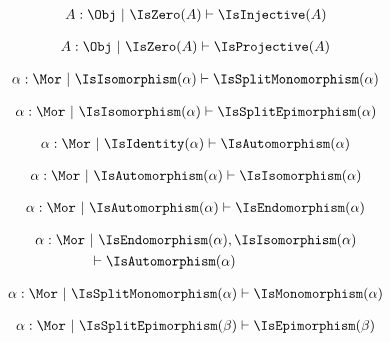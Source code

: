 \begin{sequent}
\begin{align*}
  A:\Obj ~|~ \IsZero( A ) \vdash \IsInjective( A )
\end{align*}
\end{sequent}

\begin{sequent}
\begin{align*}
  A:\Obj ~|~ \IsZero( A ) \vdash \IsProjective( A )
\end{align*}
\end{sequent}

\begin{sequent}
\begin{align*}
  \alpha:\Mor ~|~ \IsIsomorphism( \alpha ) \vdash \IsSplitMonomorphism( \alpha )
\end{align*}
\end{sequent}

\begin{sequent}
\begin{align*}
  \alpha:\Mor ~|~ \IsIsomorphism( \alpha ) \vdash \IsSplitEpimorphism( \alpha )
\end{align*}
\end{sequent}

\begin{sequent}
\begin{align*}
  \alpha:\Mor ~|~ \IsIdentity( \alpha ) \vdash \IsAutomorphism( \alpha )
\end{align*}
\end{sequent}

\begin{sequent}
\begin{align*}
  \alpha:\Mor ~|~ \IsAutomorphism( \alpha ) \vdash \IsIsomorphism( \alpha )
\end{align*}
\end{sequent}

\begin{sequent}
\begin{align*}
  \alpha:\Mor ~|~ \IsAutomorphism( \alpha ) \vdash \IsEndomorphism( \alpha )
\end{align*}
\end{sequent}

\begin{sequent}
\begin{align*}
  \alpha:\Mor ~&|~  \IsEndomorphism( \alpha ), \IsIsomorphism( \alpha ) \\ 
  &\vdash \IsAutomorphism( \alpha )
\end{align*}
\end{sequent}

\begin{sequent}
\begin{align*}
  \alpha:\Mor ~|~ \IsSplitMonomorphism( \alpha ) \vdash \IsMonomorphism( \alpha )
\end{align*}
\end{sequent}

\begin{sequent}
\begin{align*}
  \alpha:\Mor ~|~ \IsSplitEpimorphism( \beta ) \vdash \IsEpimorphism( \beta )
\end{align*}
\end{sequent}